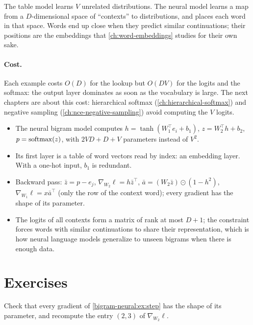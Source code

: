 \begin{notechapter}
\begin{intuition}
The table model learns $V$ unrelated distributions. The neural model learns a map from a
$D$-dimensional space of ``contexts'' to distributions, and places each word in that space.
Words end up close when they predict similar continuations; their positions are the
embeddings that \cref{ch:word-embeddings} studies for their own sake.
\end{intuition}

\paragraph{Cost.} Each example costs $O(D)$ for the lookup but $O(DV)$ for the logits and the softmax: the
output layer dominates as soon as the vocabulary is large. The next chapters are about this
cost: hierarchical softmax (\cref{ch:hierarchical-softmax}) and negative sampling
(\cref{ch:nce-negative-sampling}) avoid computing the $V$ logits.

\begin{chaptersummary}
\begin{itemize}
  \item The neural bigram model computes $h = \tanh(W_1^\top e_i + b_1)$, $z = W_2^\top h + b_2$, $p = \operatorname{softmax}(z)$, with $2VD + D + V$
        parameters instead of $V^2$.
  \item Its first layer is a table of word vectors read by index: an embedding layer. With a
        one-hot input, $b_1$ is redundant.
  \item Backward pass: $\bar z = p - e_j$, $\nabla_{W_2}\ell = h\bar z^\top$, $\bar a = (W_2\bar z)\odot(1 - h^2)$, $\nabla_{W_1}\ell = x\bar a^\top$ (only the row of the
        context word); every gradient has the shape of its parameter.
  \item The logits of all contexts form a matrix of rank at most $D + 1$; the constraint forces
        words with similar continuations to share their representation, which is how neural
        language models generalize to unseen bigrams when there is enough data.
\end{itemize}
\end{chaptersummary}

\section*{Exercises}

\begin{exercise}\label{bigram-neural:exr:1}
Check that every gradient of \cref{bigram-neural:ex:step} has the shape of its parameter, and
recompute the entry $(2, 3)$ of $\nabla_{W_2}\ell$.
\end{exercise}


\end{notechapter}
